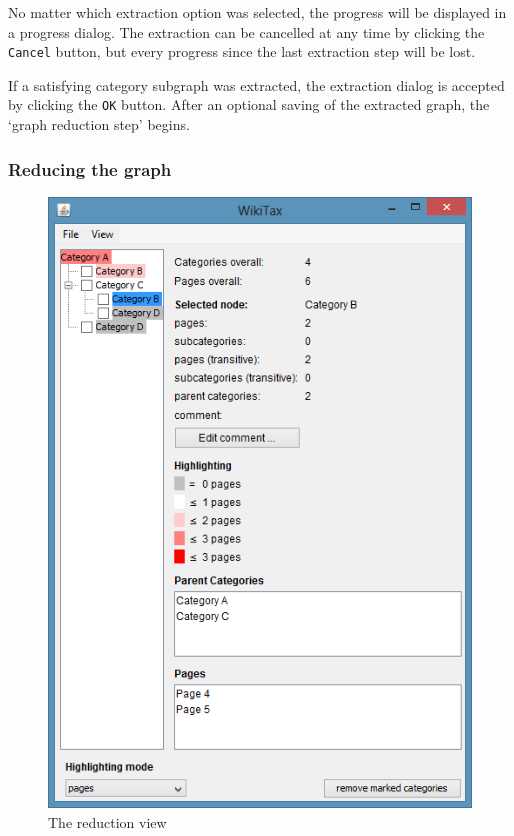 \documentclass{scrartcl}
\begin{document}
No matter which extraction option was selected, the progress will be displayed in a progress dialog. The extraction can be cancelled at any time by clicking the \texttt{Cancel} button, but every progress since the last extraction step will be lost.

If a satisfying category subgraph was extracted, the extraction dialog is accepted by clicking the \texttt{OK} button. After an optional saving of the extracted graph, the `graph reduction step' begins.

\subsubsection{Reducing the graph}
\label{sec:reduce}

\begin{figure}[ht]
\centering
\includegraphics[scale=0.5]{figures/WikiTax_selected_node.png}
\caption{The reduction view}
\label{fig:reduction_view}
\end{figure}
\end{document}
